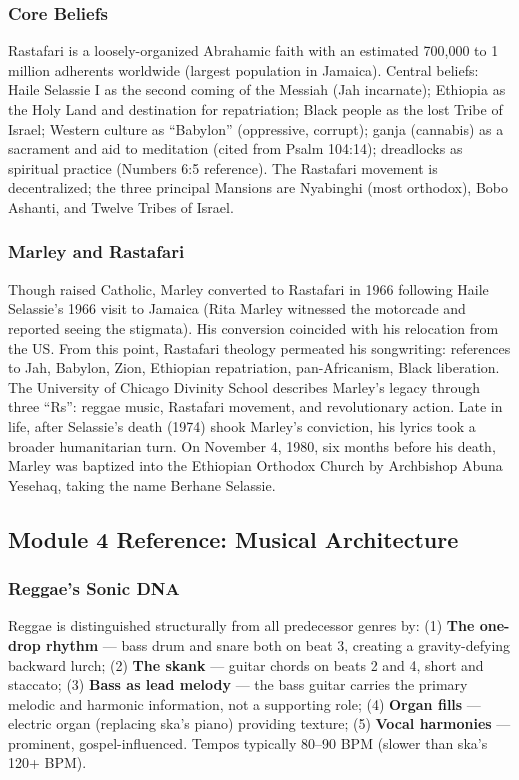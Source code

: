 \documentclass[11pt,letterpaper]{article}
\begin{document}
\subsubsection{Core Beliefs}

Rastafari is a loosely-organized Abrahamic faith with an estimated 700,000 to 1 million adherents worldwide (largest population in Jamaica). Central beliefs: Haile Selassie I as the second coming of the Messiah (Jah incarnate); Ethiopia as the Holy Land and destination for repatriation; Black people as the lost Tribe of Israel; Western culture as ``Babylon'' (oppressive, corrupt); ganja (cannabis) as a sacrament and aid to meditation (cited from Psalm 104:14); dreadlocks as spiritual practice (Numbers 6:5 reference). The Rastafari movement is decentralized; the three principal Mansions are Nyabinghi (most orthodox), Bobo Ashanti, and Twelve Tribes of Israel.

\subsubsection{Marley and Rastafari}

Though raised Catholic, Marley converted to Rastafari in 1966 following Haile Selassie's 1966 visit to Jamaica (Rita Marley witnessed the motorcade and reported seeing the stigmata). His conversion coincided with his relocation from the US. From this point, Rastafari theology permeated his songwriting: references to Jah, Babylon, Zion, Ethiopian repatriation, pan-Africanism, Black liberation. The University of Chicago Divinity School describes Marley's legacy through three ``Rs'': reggae music, Rastafari movement, and revolutionary action. Late in life, after Selassie's death (1974) shook Marley's conviction, his lyrics took a broader humanitarian turn. On November 4, 1980, six months before his death, Marley was baptized into the Ethiopian Orthodox Church by Archbishop Abuna Yesehaq, taking the name Berhane Selassie.

\subsection{Module 4 Reference: Musical Architecture}

\subsubsection{Reggae's Sonic DNA}

Reggae is distinguished structurally from all predecessor genres by: (1) \textbf{The one-drop rhythm} --- bass drum and snare both on beat 3, creating a gravity-defying backward lurch; (2) \textbf{The skank} --- guitar chords on beats 2 and 4, short and staccato; (3) \textbf{Bass as lead melody} --- the bass guitar carries the primary melodic and harmonic information, not a supporting role; (4) \textbf{Organ fills} --- electric organ (replacing ska's piano) providing texture; (5) \textbf{Vocal harmonies} --- prominent, gospel-influenced. Tempos typically 80--90 BPM (slower than ska's 120+ BPM).
\end{document}
